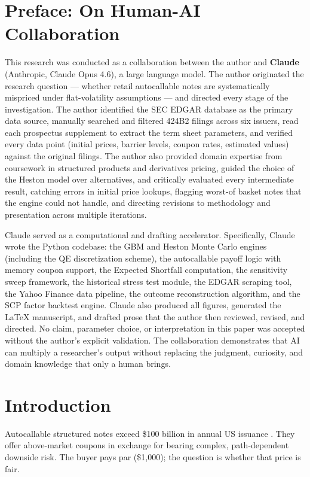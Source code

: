 \documentclass[10pt,a4paper]{article}
\begin{document}
\newpage\section*{Preface: On Human-AI Collaboration}

This research was conducted as a collaboration between the author and \textbf{Claude} (Anthropic, Claude Opus 4.6), a large language model. The author originated the research question --- whether retail autocallable notes are systematically mispriced under flat-volatility assumptions --- and directed every stage of the investigation. The author identified the SEC EDGAR database as the primary data source, manually searched and filtered 424B2 filings across six issuers, read each prospectus supplement to extract the term sheet parameters, and verified every data point (initial prices, barrier levels, coupon rates, estimated values) against the original filings. The author also provided domain expertise from coursework in structured products and derivatives pricing, guided the choice of the Heston model over alternatives, and critically evaluated every intermediate result, catching errors in initial price lookups, flagging worst-of basket notes that the engine could not handle, and directing revisions to methodology and presentation across multiple iterations.

Claude served as a computational and drafting accelerator. Specifically, Claude wrote the Python codebase: the GBM and Heston Monte Carlo engines (including the QE discretization scheme), the autocallable payoff logic with memory coupon support, the Expected Shortfall computation, the sensitivity sweep framework, the historical stress test module, the EDGAR scraping tool, the Yahoo Finance data pipeline, the outcome reconstruction algorithm, and the SCP factor backtest engine. Claude also produced all figures, generated the \LaTeX{} manuscript, and drafted prose that the author then reviewed, revised, and directed. No claim, parameter choice, or interpretation in this paper was accepted without the author's explicit validation. The collaboration demonstrates that AI can multiply a researcher's output without replacing the judgment, curiosity, and domain knowledge that only a human brings.

\newpage\tableofcontents

\newpage\section{Introduction}\label{sec:intro}
Autocallable structured notes exceed \$100 billion in annual US issuance \citep{vokata2021}. They offer above-market coupons in exchange for bearing complex, path-dependent downside risk. The buyer pays par (\$1,000); the question is whether that price is fair.
\end{document}
